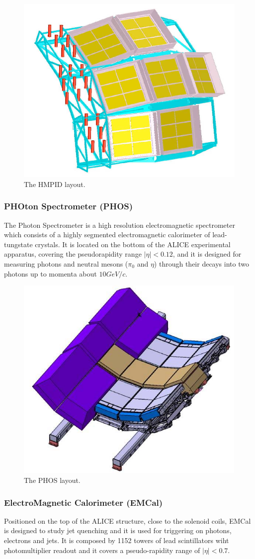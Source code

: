 \begin{figure}[!h]
\begin{center}
\includegraphics[width=0.4\linewidth]{Chapters/Introduction/Figs/hmpid.jpg}
\caption{The HMPID layout.}
\label{fig:HMPID}
\end{center}
\end{figure}

\subsubsection{PHOton Spectrometer (PHOS)}
The Photon Spectrometer is a high resolution electromagnetic spectrometer which consists of a highly segmented electromagnetic calorimeter of lead-tungstate crystals.
It is located on the bottom of the ALICE experimental apparatus, covering the pseudorapidity range $|\eta| < 0.12$, and it is designed for measuring photons and neutral mesons ($\pi_0$ and $\eta$) through their decays into two photons up to momenta about $10 GeV/c$.

\begin{figure}[!h]
\begin{center}
\includegraphics[width=0.5\linewidth]{Chapters/Introduction/Figs/phos.jpg}
\caption{The PHOS layout.}
\label{fig:PHOS}
\end{center}
\end{figure}

\subsubsection{ElectroMagnetic Calorimeter (EMCal)}
Positioned on the top of the ALICE structure, close to the solenoid coils, EMCal is designed to study jet quenching and it is used for triggering on photons, electrons and jets.
It is composed by 1152 towers of lead scintillators wiht photomultiplier readout and it covers a pseudo-rapidity range of $|\eta| < 0.7$.

